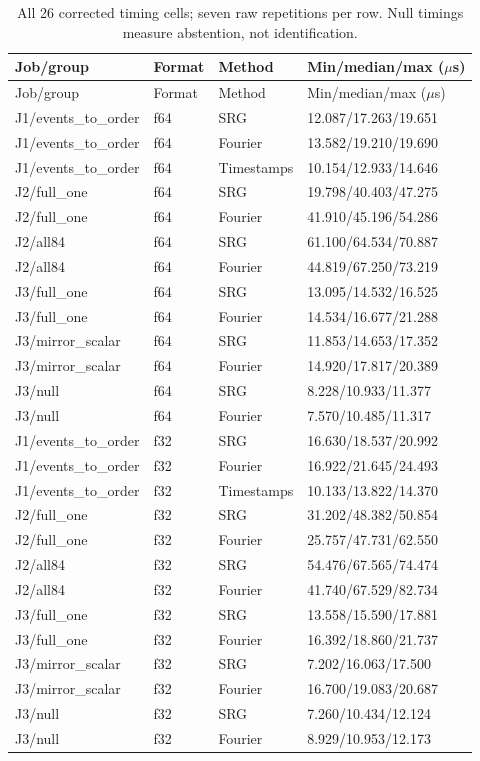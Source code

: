 \begin{longtable}{P{43mm}lll}
\caption{All 26 corrected timing cells; seven raw repetitions per row. Null timings measure abstention, not identification.}\\
\toprule Job/group & Format & Method & Min/median/max ($\mu$s)\\\midrule\endfirsthead
\toprule Job/group & Format & Method & Min/median/max ($\mu$s)\\\midrule\endhead
J1/events\_to\_order & f64 & SRG & 12.087/17.263/19.651\\
J1/events\_to\_order & f64 & Fourier & 13.582/19.210/19.690\\
J1/events\_to\_order & f64 & Timestamps & 10.154/12.933/14.646\\
J2/full\_one & f64 & SRG & 19.798/40.403/47.275\\
J2/full\_one & f64 & Fourier & 41.910/45.196/54.286\\
J2/all84 & f64 & SRG & 61.100/64.534/70.887\\
J2/all84 & f64 & Fourier & 44.819/67.250/73.219\\
J3/full\_one & f64 & SRG & 13.095/14.532/16.525\\
J3/full\_one & f64 & Fourier & 14.534/16.677/21.288\\
J3/mirror\_scalar & f64 & SRG & 11.853/14.653/17.352\\
J3/mirror\_scalar & f64 & Fourier & 14.920/17.817/20.389\\
J3/null & f64 & SRG & 8.228/10.933/11.377\\
J3/null & f64 & Fourier & 7.570/10.485/11.317\\
J1/events\_to\_order & f32 & SRG & 16.630/18.537/20.992\\
J1/events\_to\_order & f32 & Fourier & 16.922/21.645/24.493\\
J1/events\_to\_order & f32 & Timestamps & 10.133/13.822/14.370\\
J2/full\_one & f32 & SRG & 31.202/48.382/50.854\\
J2/full\_one & f32 & Fourier & 25.757/47.731/62.550\\
J2/all84 & f32 & SRG & 54.476/67.565/74.474\\
J2/all84 & f32 & Fourier & 41.740/67.529/82.734\\
J3/full\_one & f32 & SRG & 13.558/15.590/17.881\\
J3/full\_one & f32 & Fourier & 16.392/18.860/21.737\\
J3/mirror\_scalar & f32 & SRG & 7.202/16.063/17.500\\
J3/mirror\_scalar & f32 & Fourier & 16.700/19.083/20.687\\
J3/null & f32 & SRG & 7.260/10.434/12.124\\
J3/null & f32 & Fourier & 8.929/10.953/12.173\\
\bottomrule\end{longtable}
